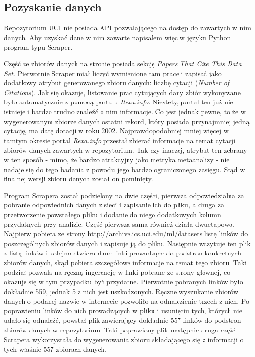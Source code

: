 \subsection{Pozyskanie danych}

Repozytorium UCI nie posiada API pozwalającego na dostęp do zawartych w nim danych.
Aby uzyskać dane w nim zawarte napisałem więc w języku Python program typu Scraper.

Część ze zbiorów danych na stronie posiada sekcję \emph{Papers That Cite This Data Set}.
Pierwotnie Scraper miał liczyć wymienione tam prace i zapisać jako dodatkowy atrybut generowanego zbioru danych: liczbę cytacji (\emph{Number of Citations}).
Jak się okazuje, listowanie prac cytujących dany zbiór wykonywane było automatycznie z pomocą portalu \emph{Rexa.info}.
Niestety, portal ten już nie istnieje i bardzo trudno znaleźć o nim informacje.
Co jest jednak pewne, to że w wygenerowanym zbiorze danych ostatni rekord, który posiada przynajmniej jedną cytację, ma datę dotacji w roku 2002.
Najprawdopodobniej mniej więcej w tamtym okresie portal \emph{Rexa.info} przestał zbierać informacje na temat cytacji zbiorów danych zawartych w repozytorium.
Tak czy inaczej, atrybut ten zebrany w ten sposób - mimo, że bardzo atrakcyjny jako metryka metaanalizy - nie nadaje się do tego badania z powodu jego bardzo ograniczonego zasięgu.
Stąd w finalnej wersji zbioru danych został on pominięty.

Program Scrapera został podzielony na dwie części, pierwsza odpowiedzialna za pobranie odpowiednich danych z sieci i zapisanie ich do pliku, a druga za przetworzenie powstałego pliku i dodanie do niego dodatkowych kolumn przydatnych przy analizie.
Część pierwsza sama również działa dwuetapowo.
Najpierw pobiera ze strony \url{http://archive.ics.uci.edu/ml/datasets} listę linków do poszczególnych zbiorów danych i zapisuje ją do pliku.
Następnie wczytuje ten plik z listą linków i kolejno otwiera dane linki prowadzące do podstron konkretnych zbiorów danych, skąd pobiera szczegółowe informacje na temat tego zbioru.
Taki podział pozwala na ręczną ingerencję w linki pobrane ze strony głównej, co okazuje się w tym przypadku być przydatne.
Pierwotnie pobranych linków było dokładnie 559, jednak 5 z nich jest uszkodzonych.
Ręczne wyszukanie zbiorów danych o podanej nazwie w internecie pozwoliło na odnalezienie trzech z nich.
Po poprawieniu linków do nich prowadzących w pliku i usunięciu tych, których nie udało się odnaleźć, powstał plik zawierający dokładnie 557 linków do podstron zbiorów danych w repozytorium.
Taki poprawiony plik następnie druga część Scrapera wykorzystała do wygenerowania zbioru składającego się z informacji o tych właśnie 557 zbiorach danych.


